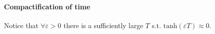 \documentclass[../main.tex]{subfiles}
\begin{document}
\paragraph{Compactification of time}\label{par:compactification}

Notice that $\forall\varepsilon>0$ there is a sufficiently large $T$ s.t. $\text{tanh}(\varepsilon T)\approx0$.
\end{document}
